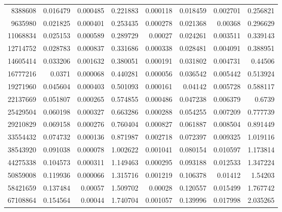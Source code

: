 \begin{longtable}{r r r r r r r r}
8388608 & 0.016479 & 0.000485 & 0.221883 & 0.000118 & 0.018459 & 0.002701 & 0.256821 \\
9635980 & 0.021825 & 0.000401 & 0.253435 & 0.000278 & 0.021368 & 0.00368 & 0.296629 \\
11068834 & 0.025153 & 0.000589 & 0.289729 & 0.00027 & 0.024261 & 0.003511 & 0.339143 \\
12714752 & 0.028783 & 0.000837 & 0.331686 & 0.000338 & 0.028481 & 0.004091 & 0.388951 \\
14605414 & 0.033206 & 0.001632 & 0.380051 & 0.000191 & 0.031802 & 0.004731 & 0.44506 \\
16777216 & 0.0371 & 0.000068 & 0.440281 & 0.000056 & 0.036542 & 0.005442 & 0.513924 \\
19271960 & 0.045604 & 0.000403 & 0.501093 & 0.000161 & 0.04142 & 0.005728 & 0.588117 \\
22137669 & 0.051807 & 0.000265 & 0.574855 & 0.000486 & 0.047238 & 0.006379 & 0.6739 \\
25429504 & 0.060198 & 0.000327 & 0.663286 & 0.000288 & 0.054255 & 0.007209 & 0.777739 \\
29210829 & 0.069158 & 0.000276 & 0.760404 & 0.000827 & 0.061887 & 0.008504 & 0.891449 \\
33554432 & 0.074732 & 0.000136 & 0.871987 & 0.002718 & 0.072397 & 0.009325 & 1.019116 \\
38543920 & 0.091038 & 0.000078 & 1.002622 & 0.001041 & 0.080154 & 0.010597 & 1.173814 \\
44275338 & 0.104573 & 0.000311 & 1.149463 & 0.000295 & 0.093188 & 0.012533 & 1.347224 \\
50859008 & 0.119936 & 0.000066 & 1.315716 & 0.001219 & 0.106378 & 0.01412 & 1.54203 \\
58421659 & 0.137484 & 0.00057 & 1.509702 & 0.00028 & 0.120557 & 0.015499 & 1.767742 \\
67108864 & 0.154564 & 0.00044 & 1.740704 & 0.001057 & 0.139996 & 0.017998 & 2.035265 \\
\end{longtable}
